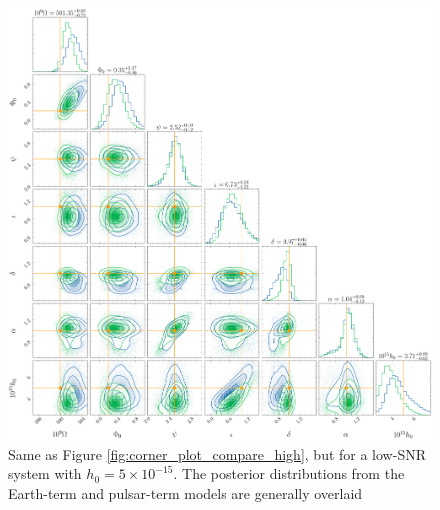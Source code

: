 \documentclass[fleqn,usenatbib,useAMS]{mnras}
\begin{document}
\begin{figure}
	\includegraphics[width=\textwidth, height =\textwidth ]{images/corner_lowSNR_compare}
	\caption{Same as Figure \ref{fig:corner_plot_compare_high}, but for a low-SNR system with $h_0 = 5 \times 10^{-15}$. The posterior distributions from the Earth-term and pulsar-term models are generally overlaid }
	\label{fig:corner_plot_compare_low}
\end{figure}
\end{document}

